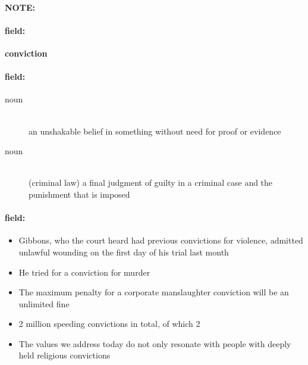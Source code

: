 \documentclass[12pt]{article}
\newenvironment{note}{\paragraph{NOTE:}}{}
\newenvironment{field}{\paragraph{field:}}{}
\begin{document}
\begin{note}
\begin{field}
\textbf{\large conviction}
\end{field}


\begin{field}
\begin{description}
\item[noun] \hfill \\ 
an unshakable belief in something without need for proof or evidence

\item[noun] \hfill \\ 
(criminal law) a final judgment of guilty in a criminal case and the punishment that is imposed

\end{description}
\end{field}

\begin{field}
\begin{itemize}
\item Gibbons, who the court heard had previous convictions for violence, admitted unlawful wounding on the first day of his trial last month
\item He tried for a conviction for murder
\item The maximum penalty for a corporate manslaughter conviction will be an unlimited fine
\item 2 million speeding convictions in total, of which 2
\item The values we address today do not only resonate with people with deeply held religious convictions
\end{itemize}
\end{field}
\end{note}
\end{document}
